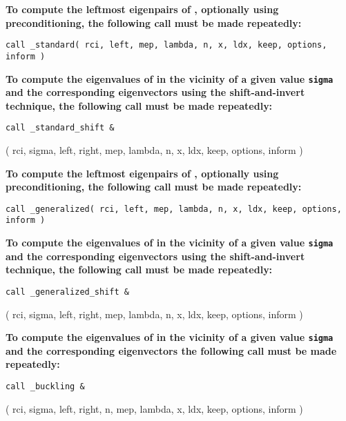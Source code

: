 {\bf
To compute %
the leftmost eigenpairs of ,
optionally using preconditioning,
the following call must be made repeatedly:
}

\medskip
{\tt call
\solver\_standard( rci, left, mep, lambda, n, x, ldx, keep, options, inform )
}

\medskip
\noindent
{\bf
To compute the eigenvalues of  %
in the vicinity of 
a given value {\tt sigma}
and the corresponding eigenvectors using the shift-and-invert technique,
the following call must be made repeatedly:
}

\medskip
{\tt call
\solver\_standard\_shift \&

\hspace{8mm} 
( rci, sigma, left, right, mep, lambda, n, x, ldx, keep, options, inform )
}

\medskip
\noindent
{\bf
To compute %
the leftmost eigenpairs of ,
optionally using preconditioning,
the following call must be made repeatedly:
}

\medskip
{\tt call
\solver\_generalized( rci, left, mep, lambda, n, x, ldx, keep, options, inform )
}

\medskip
\noindent
{\bf
To compute the eigenvalues of  %
in the vicinity of 
a given value {\tt sigma}
and the corresponding eigenvectors using the shift-and-invert technique,
the following call must be made repeatedly:
}

\medskip
{\tt call
\solver\_generalized\_shift \&

\hspace{8mm} 
( rci, sigma, left, right, mep, lambda, n, x, ldx, keep, options, inform )
}

\medskip
\noindent
{\bf
To compute the eigenvalues of  %
in the vicinity of 
a given value {\tt sigma}
and the corresponding eigenvectors %
the following call must be made repeatedly:
}

\medskip
{\tt call
\solver\_buckling \&

\hspace{8mm} 
( rci, sigma, left, right, n, mep, lambda, x, ldx, keep, options, inform )
}


